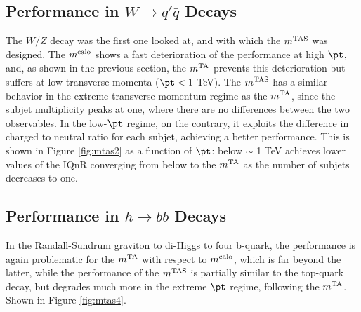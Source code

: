 
\subsection{Performance in $W \to q'\bar{q}$ Decays}
The $W/Z$ decay was the first one looked at, and with which the $m^\textrm{TAS}$ was designed. The $m^\textrm{calo}$ shows a fast deterioration of the performance at high $\pt$, and, as shown in the previous section, the $m^\textrm{TA}$ prevents this deterioration but suffers at low transverse momenta ($\pt<1$ TeV).
The $m^\textrm{TAS}$ has a similar behavior in the extreme transverse momentum regime as the $m^\textrm{TA}$, since the subjet multiplicity peaks at one, where there are no differences between the two observables.
In the low-$\pt$ regime, on the contrary, it exploits the difference in charged to neutral ratio for each subjet, achieving a better performance.
This is shown in Figure \ref{fig:mtas2} as a function of $\pt$: below $\sim$ 1 TeV achieves lower values of the IQnR converging from below to the $m^\textrm{TA}$ as the number of subjets decreases to one.



\subsection{Performance in $h\to b\bar{b}$ Decays}
In the Randall-Sundrum graviton to di-Higgs to four b-quark, the performance is again problematic for the $m^\textrm{TA}$ with respect to $m^\textrm{calo}$, which is far beyond the latter, while the performance of the $m^\textrm{TAS}$ is partially similar to the top-quark decay, but degrades much more in the extreme $\pt$ regime, following the $m^\textrm{TA}$. Shown in Figure \ref{fig:mtas4}.

